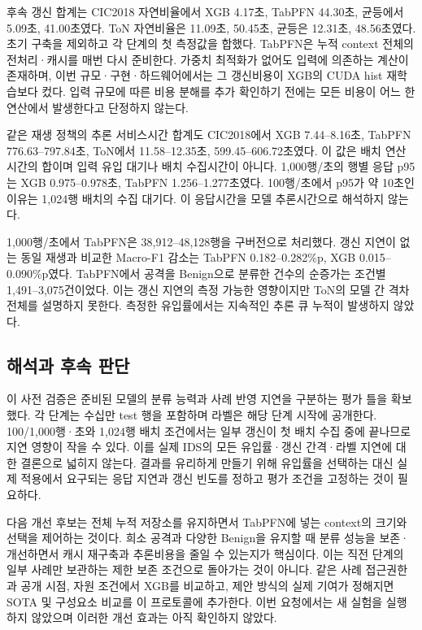 후속 갱신 합계는 CIC2018 자연비율에서 XGB 4.17초, TabPFN 44.30초, 균등에서 5.09초, 41.00초였다. ToN 자연비율은 11.09초, 50.45초, 균등은 12.31초, 48.56초였다. 초기 구축을 제외하고 각 단계의 첫 측정값을 합했다. TabPFN은 누적 context 전체의 전처리·캐시를 매번 다시 준비한다. 가중치 최적화가 없어도 입력에 의존하는 계산이 존재하며, 이번 규모·구현·하드웨어에서는 그 갱신비용이 XGB의 CUDA hist 재학습보다 컸다. 입력 규모에 따른 비용 분해를 추가 확인하기 전에는 모든 비용이 어느 한 연산에서 발생한다고 단정하지 않는다.

같은 재생 정책의 추론 서비스시간 합계도 CIC2018에서 XGB 7.44–8.16초, TabPFN 776.63–797.84초, ToN에서 11.58–12.35초, 599.45–606.72초였다. 이 값은 배치 연산시간의 합이며 입력 유입 대기나 배치 수집시간이 아니다. 1,000행/\allowbreak{}초의 행별 응답 p95는 XGB 0.975–0.978초, TabPFN 1.256–1.277초였다. 100행/\allowbreak{}초에서 p95가 약 10초인 이유는 1,024행 배치의 수집 대기다. 이 응답시간을 모델 추론시간으로 해석하지 않는다.

1,000행/\allowbreak{}초에서 TabPFN은 38,912–48,128행을 구버전으로 처리했다. 갱신 지연이 없는 동일 재생과 비교한 Macro-F1 감소는 TabPFN 0.182–0.282\%p, XGB 0.015–0.090\%p였다. TabPFN에서 공격을 Benign으로 분류한 건수의 순증가는 조건별 1,491–3,075건이었다. 이는 갱신 지연의 측정 가능한 영향이지만 ToN의 모델 간 격차 전체를 설명하지 못한다. 측정한 유입률에서는 지속적인 추론 큐 누적이 발생하지 않았다.

\subsection{해석과 후속 판단}
이 사전 검증은 준비된 모델의 분류 능력과 사례 반영 지연을 구분하는 평가 틀을 확보했다. 각 단계는 수십만 test 행을 포함하며 라벨은 해당 단계 시작에 공개한다. 100/\allowbreak{}1,000행·초와 1,024행 배치 조건에서는 일부 갱신이 첫 배치 수집 중에 끝나므로 지연 영향이 작을 수 있다. 이를 실제 IDS의 모든 유입률·갱신 간격·라벨 지연에 대한 결론으로 넓히지 않는다. 결과를 유리하게 만들기 위해 유입률을 선택하는 대신 실제 적용에서 요구되는 응답 지연과 갱신 빈도를 정하고 평가 조건을 고정하는 것이 필요하다.

다음 개선 후보는 전체 누적 저장소를 유지하면서 TabPFN에 넣는 context의 크기와 선택을 제어하는 것이다. 희소 공격과 다양한 Benign을 유지할 때 분류 성능을 보존·개선하면서 캐시 재구축과 추론비용을 줄일 수 있는지가 핵심이다. 이는 직전 단계의 일부 사례만 보관하는 제한 보존 조건으로 돌아가는 것이 아니다. 같은 사례 접근권한과 공개 시점, 자원 조건에서 XGB를 비교하고, 제안 방식의 실제 기여가 정해지면 SOTA 및 구성요소 비교를 이 프로토콜에 추가한다. 이번 요청에서는 새 실험을 실행하지 않았으며 이러한 개선 효과는 아직 확인하지 않았다.

